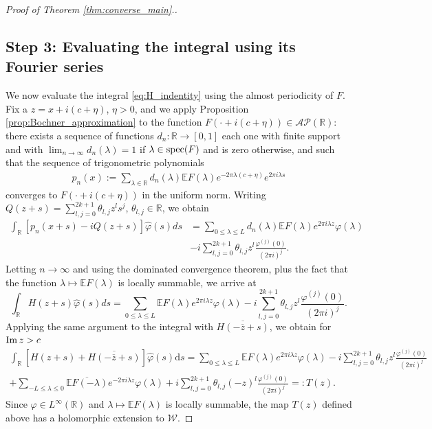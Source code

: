 \documentclass[a4paper,reqno,12pt]{amsart}
\newcommand{\A}{\mathcal{A}}
\renewcommand{\P}{\mathcal{P}}
\newcommand{\W}{\mathcal{W}}
\renewcommand{\r}{\mathbb{R}}
\newcommand{\ft}{\widehat}
\newcommand{\la}{\lambda}
\newcommand{\p}{\varphi}
\renewcommand{\d}{\mathrm{d}}
\newcommand{\ov}[1]{\overline{#1}}
\newcommand{\cd}{\cdot}
\newcommand{\1}{{\bf 1}}
\newcommand{\ra}{\rightarrow}
\newcommand{\e}{\mathbb{E}}
\newcommand{\mt}{\mapsto}
\renewcommand{\Im}{{\rm Im}\,}
\newcommand{\spec}{{\rm spec}}
\begin{document}
\begin{proof}[Proof of Theorem \ref{thm:converse_main}.]
\subsection*{Step 3: Evaluating the integral using its Fourier series} We now evaluate the integral \eqref{eq:H_indentity} using the almost periodicity of $F$. Fix a $z=x+i(c+\eta)$, $\eta>0$, and we apply Proposition \ref{prop:Bochner_approximation} to the function $F(\cd+i(c+\eta))\in\A\P(\r)$: there exists a sequence of functions $d_n:\r\ra[0,1]$ each one with finite support and with $\lim_{n\ra\infty} d_n(\la)=1$ if $\la\in\spec(F)$ and is zero otherwise, and such that the sequence of trigonometric polynomials
\begin{align*}
    p_n(x):=\sum_{\la\in\r} d_n(\la)\e F(\la)e^{-2\pi\la(c+\eta)}e^{2\pi i\la s}
\end{align*}
converges to $F(\cd+i(c+\eta))$ in the uniform norm. Writing $Q(z+s)=\sum_{l,j=0}^{2k+1} \theta_{l,j} z^l s^j$, $\theta_{l,j}\in\r$, we obtain
\begin{align*}
\int_{\r} \left[p_n(x+s)-iQ(z+s)\right]\ft{\varphi}(s)ds&=\sum_{0\leq\la\leq L} d_n(\la) \e F(\la)e^{2\pi i\la z}\varphi(\la)\\
&-i\sum_{l,j=0}^{2k+1} \theta_{l,j} z^l\frac{\varphi^{(j)}(0)}{(2\pi i)^j}.
\end{align*}
Letting $n\ra\infty$ and using the dominated convergence theorem, plus the fact that the function $\la\mt\e F(\la)$ is locally summable, we arrive at
\begin{equation*}
\int_{\r} H(z+s)\ft{\varphi}(s)ds=\sum_{0\leq\la\leq L} \e F(\la)e^{2\pi i\la z}\varphi(\la)-i\sum_{l,j=0}^{2k+1} \theta_{l,j} z^l\frac{\varphi^{(j)}(0)}{(2\pi i)^j}.
\end{equation*}
Applying the same argument to the integral with $\ov{H(-\ov{z}+s)}$, we obtain for $\Im{z}>c$
\begin{align}
\label{eq:contribution_a}
    \int_{\r} \left[H(z+s)+\ov{H(-\ov{z}+s)}\right]\ft{\p}(s)\d s=\sum_{0\leq\la\leq L} \e F(\la)e^{2\pi i\la z}\p(\la)-i\sum_{l,j=0}^{2k+1} \theta_{l,j} z^l\frac{\p^{(j)}(0)}{(2\pi i)^j}\\
    +\sum_{-L\leq\la\leq 0} \ov{\e F(-\la)}e^{-2\pi i\la z}\p(\la)+i\sum_{l,j=0}^{2k+1} \theta_{l,j} (-z)^l\frac{\p^{(j)}(0)}{(2\pi i)^j}=:T(z).
\end{align}
Since $\p\in L^\infty(\r)$ and $\la\mt\e F(\la)$ is locally summable,  the map $T(z)$ defined above has a holomorphic extension to $\W$.

\end{proof}
\end{document}
